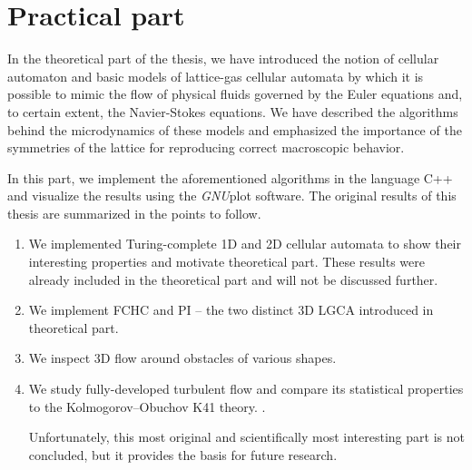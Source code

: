 

\chapter{Practical part}

In the theoretical part of the thesis, we have introduced the notion of cellular automaton and basic models of lattice-gas cellular automata by which it is possible to mimic the flow of physical fluids governed by the Euler equations and, to certain extent, the Navier-Stokes equations.
We have described the algorithms behind the microdynamics of these models and emphasized the importance of the symmetries of the lattice for reproducing correct macroscopic behavior.

In this part, we implement the aforementioned algorithms in the language C++ and visualize the results using the \textit{GNU}plot software. The original results of this thesis are summarized in the points to follow.



\begin{enumerate}
\item We implemented Turing-complete 1D and 2D cellular automata to show their interesting properties and motivate theoretical part. These results were already included in the theoretical part and will not be discussed further.
\item We implement FCHC and PI -- the two distinct 3D LGCA introduced in theoretical part.
\item We inspect 3D flow around obstacles of various shapes.
\item We study fully-developed turbulent flow and compare its statistical pro\-perties to the Kolmogorov--Obuchov K41 theory. \cite{wolf}.

Unfortunately, this most original and scientifically most interesting part is not concluded, but it provides the basis for future research. 

\end{enumerate}

